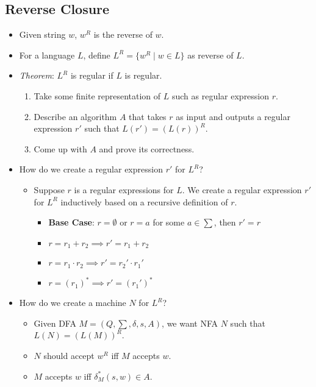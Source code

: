 \subsection{Reverse Closure}
\begin{itemize}
    \item Given string $w$, $w^R$ is the reverse of $w$.
    \item For a language $L$, define $L^R = \{ w^R \mid w \in L \}$ as reverse of $L$.
    \item \textit{Theorem}: $L^R$ is regular if $L$ is regular.
    \begin{enumerate}
        \item Take some finite representation of $L$ such as regular expression $r$.
        \item Describe an algorithm $A$ that takes $r$ as input and outputs a regular expression $r'$ such that $L(r') = (L(r))^R$.
        \item Come up with $A$ and prove its correctness.
    \end{enumerate}
    \item How do we create a regular expression $r'$ for $L^R$?
    \begin{itemize}
        \item Suppose $r$ is a regular expressions for $L$. We create a regular expression $r'$ for $L^R$ inductively based on a recursive definition of $r$.
        \begin{itemize}
            \item \textbf{Base Case}: $r = \emptyset$ or $r = a$ for some $a \in \sum$, then $r' = r$
            \item $r = r_1 + r_2 \implies r' = r_1 + r_2$
            \item $r = r_1 \cdot r_2 \implies r' = r_2' \cdot r_1'$
            \item $r = (r_1)^{\ast} \implies r' = (r_1')^{\ast}$
        \end{itemize}
    \end{itemize}
    \item How do we create a machine $N$ for $L^R$?
    \begin{itemize}
        \item Given DFA $M = (Q, \sum, \delta, s, A)$, we want NFA $N$ such that $L(N) = (L(M))^R$.
        \item $N$ should accept $w^R$ iff $M$ accepts $w$.
        \item $M$ accepts $w$ iff $\delta_M^{\ast}(s,w) \in A$.
    \end{itemize}
\end{itemize}
